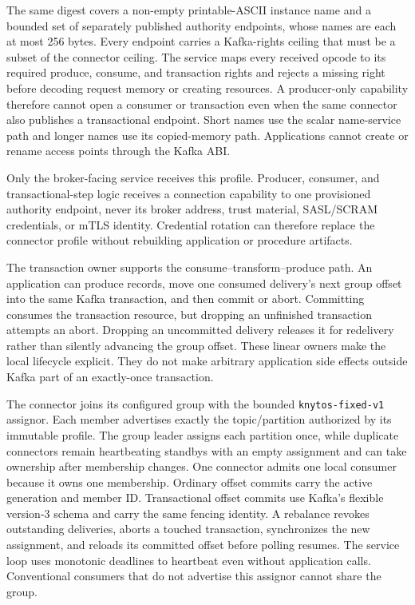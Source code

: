 The same digest covers a non-empty printable-ASCII instance name and a bounded
set of separately published authority endpoints, whose names are each at most
256 bytes. Every endpoint carries a Kafka-rights ceiling that must be a subset
of the connector ceiling. The service maps every received opcode to its
required produce, consume, and transaction rights and rejects a missing right
before decoding request memory or creating resources. A producer-only
capability therefore cannot open a consumer or transaction even when the same
connector also publishes a transactional endpoint. Short names use the scalar
name-service path and longer names use its copied-memory path. Applications
cannot create or rename access points through the Kafka ABI.

Only the broker-facing service receives this profile. Producer, consumer, and
transactional-step logic receives a connection capability to one provisioned
authority endpoint, never its broker address, trust material, SASL/SCRAM
credentials, or mTLS identity. Credential rotation can therefore replace the
connector profile without rebuilding application or procedure artifacts.

The transaction owner supports the consume--transform--produce path. An
application can produce records, move one consumed delivery's next group
offset into the same Kafka transaction, and then commit or abort. Committing
consumes the transaction resource, but dropping an unfinished transaction attempts
an abort. Dropping an uncommitted delivery releases it for redelivery rather
than silently advancing the group offset. These linear owners make the local
lifecycle explicit. They do not make arbitrary application side effects outside
Kafka part of an exactly-once transaction.

The connector joins its configured group with the bounded
\texttt{knytos-fixed-v1} assignor. Each member advertises exactly the
topic/partition authorized by its immutable profile. The group leader assigns
each partition once, while duplicate connectors remain heartbeating standbys with an
empty assignment and can take ownership after membership changes. One connector
admits one local consumer because it owns one membership. Ordinary offset
commits carry the active generation and member ID. Transactional offset commits
use Kafka's flexible version-3 schema and carry the same fencing identity. A
rebalance revokes outstanding deliveries, aborts a touched transaction,
synchronizes the new assignment, and reloads its committed offset before
polling resumes. The service loop uses monotonic deadlines to heartbeat even
without application calls. Conventional consumers that do not advertise this
assignor cannot share the group.

